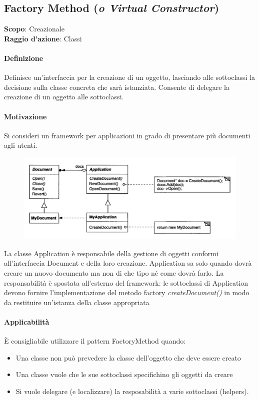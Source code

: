 \subsection{Factory Method (\textit{o Virtual Constructor})}
\label{factory-method}

\textbf{Scopo}: Creazionale  \\
\textbf{Raggio d'azione}: Classi

\paragraph{Definizione} Definisce un'interfaccia per la creazione di un oggetto, lasciando alle sottoclassi la decisione sulla classe concreta che sarà istanziata. Consente di delegare la creazione di un oggetto alle sottoclassi.

\paragraph{Motivazione} Si consideri un framework per applicazioni in grado di presentare più documenti agli utenti.

\begin{figure}[H]
    \centering
    \includegraphics[width=0.75\linewidth]{assets/pattern/factory-method/factory-method-esempio.png}
\end{figure}

La classe Application è responsabile della gestione di oggetti conformi all’interfaccia Document e della loro creazione. Application sa solo quando dovrà creare un nuovo documento ma non di che tipo né come dovrà farlo. La responsabilità è spostata all’esterno del framework: le sottoclassi di Application devono fornire l’implementazione del metodo factory \textit{createDocument()} in modo da restituire un’istanza della classe appropriata

\paragraph{Applicabilità} È consigliabile utilizzare il pattern FactoryMethod quando:
\begin{itemize}
    \item Una classe non può prevedere la classe dell'oggetto che deve essere creato
    \item Una classe vuole che le sue sottoclassi specifichino gli oggetti da creare
    \item Si vuole delegare (e localizzare) la resposabilità a varie sottoclassi (helpers).
\end{itemize}

